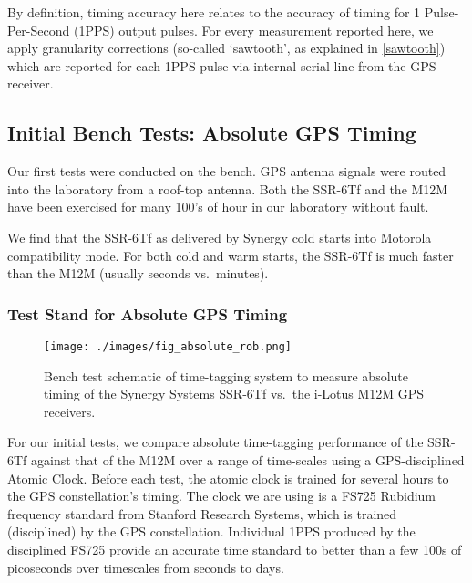 By definition, timing accuracy here relates to the accuracy of timing for
1 Pulse-Per-Second (1PPS) output pulses. For every measurement reported
here, we apply granularity corrections (so-called `sawtooth', as explained in \autoref{sawtooth})
which are reported for each 1PPS pulse via internal serial line from the GPS
receiver.

\subsection{Initial Bench Tests:  Absolute GPS Timing}

Our first tests were conducted on the bench.  GPS antenna signals were routed into the
laboratory from a roof-top antenna.  Both the SSR-6Tf and the M12M have been exercised
for many 100's of hour in our laboratory without fault.

We find that the SSR-6Tf as delivered by Synergy cold starts into
Motorola compatibility mode.  For both cold and warm starts, the
SSR-6Tf is much faster than the M12M (usually seconds vs.~minutes).

\subsubsection{Test Stand for Absolute GPS Timing} 

\label{timprime}
\begin{figure}[h!]
\centering
\texttt{[image: ./images/fig\_absolute\_rob.png]}
\caption[Absolute Timing Test Diagram]{Bench test schematic of time-tagging system to measure absolute timing of the Synergy Systems SSR-6Tf vs.~the i-Lotus M12M GPS receivers.}
\label{fig_absolute}
\end{figure}
For our initial tests, we compare absolute time-tagging performance of
the SSR-6Tf against that of the M12M over a range of time-scales using
a GPS-disciplined Atomic Clock.  Before each test, the atomic clock is
trained for several hours to the GPS constellation's timing. The clock
we are using is a FS725 Rubidium frequency standard from Stanford
Research Systems, which is trained (disciplined) by the GPS constellation.
Individual 1PPS produced by the disciplined FS725 provide an accurate
time standard to better than a few 100s of picoseconds over timescales
from seconds to days.

